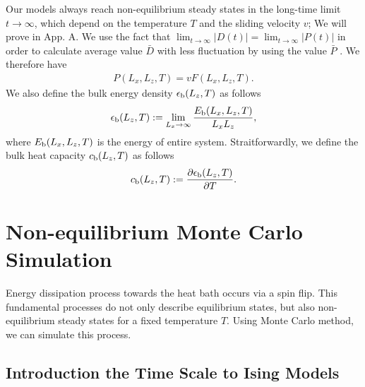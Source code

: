 Our models always reach non-equilibrium steady states in the long-time limit $t\to\infty$, which depend on the temperature $T$ and the sliding velocity $v$; We will prove in App. A. We use the fact that $\lim_{t\to\infty}|D(t)|=\lim_{t\to\infty}|P(t)|$ in order to calculate average value $\bar{D}$ with less fluctuation by using the value $\bar{P}$ \cite{Magiera2009a, Magiera2011, Magiera2011b}. We therefore have
\begin{align}
P(L_{x}, L_{z}, T)=vF(L_{x}, L_{z}, T)\label{for:frictionalforce2}.
\end{align}
We also define the bulk energy density $\epsilon_{\rm b}(L_{z}, T)$ as follows
\begin{align}
\epsilon_{\rm b}(L_{z}, T):=\lim_{L_{x}\to\infty}\frac{E_{\rm b}(L_{x}, L_{z}, T)}{L_{x}L_{z}},
\end{align}
where $E_{\rm b}(L_{x}, L_{z}, T)$ is the energy of entire system. Straitforwardly, we define the bulk heat capacity $c_{\rm b}(L_{z}, T)$ as follows
\begin{align}
c_{\rm b}(L_{z}, T):=\frac{\partial \epsilon_{\rm b}(L_{z}, T)}{\partial T}.
\end{align}

\section{Non-equilibrium Monte Carlo Simulation}

Energy dissipation process towards the heat bath occurs via a spin flip. This fundamental processes do not only describe equilibrium states, but also non-equilibrium steady states for a fixed temperature $T$\cite{Glauber1963}. Using Monte Carlo method, we can simulate this process.

\subsection{Introduction the Time Scale to Ising Models}

